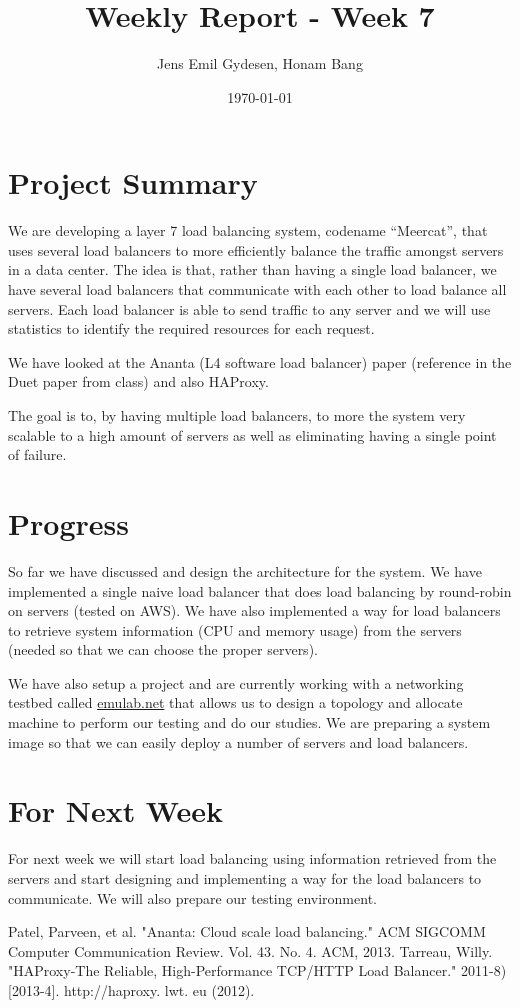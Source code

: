 \documentclass[11pt,letter]{article}
\author{Jens Emil Gydesen, Honam Bang}
\date{\today}
\title{Weekly Report - Week 7}
\begin{document}
\maketitle
\section{Project Summary}
We are developing a layer 7 load balancing system, codename ``Meercat'', that uses several load balancers to more efficiently balance the traffic amongst servers in a data center. The idea is that, rather than having a single load balancer, we have several load balancers that communicate with each other to load balance all servers. Each load balancer is able to send traffic to any server and we will use statistics to identify the required resources for each request.

We have looked at the Ananta (L4 software load balancer) paper (reference in the Duet paper from class)\cite{ananta} and also HAProxy\cite{haproxy}.

The goal is to, by having multiple load balancers, to more the system very scalable to a high amount of servers as well as eliminating having a single point of failure. 

\section{Progress}
So far we have discussed and design the architecture for the system. We have implemented a single naive load balancer that does load balancing by round-robin on servers (tested on AWS). We have also implemented a way for load balancers to retrieve system information (CPU and memory usage) from the servers (needed so that we can choose the proper servers). 

We have also setup a project and are currently working with a networking testbed called \url{emulab.net} that allows us to design a topology and allocate machine to perform our testing and do our studies. We are preparing a system image so that we can easily deploy a number of servers and load balancers. 

\section{For Next Week}
For next week we will start load balancing using information retrieved from the servers and start designing and implementing a way for the load balancers to communicate. We will also prepare our testing environment. 

\begin{thebibliography}{9}
  Patel, Parveen, et al. "Ananta: Cloud scale load balancing." ACM SIGCOMM Computer Communication Review. Vol. 43. No. 4. ACM, 2013.
  Tarreau, Willy. "HAProxy-The Reliable, High-Performance TCP/HTTP Load Balancer." 2011-8)[2013-4]. http://haproxy. lwt. eu (2012).
\end{thebibliography}
\end{document}
